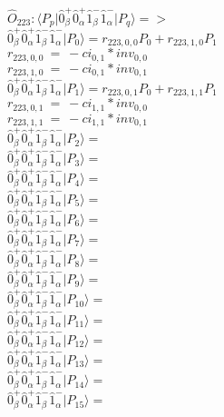 \documentclass[14pt]{article}
\begin{document}
    $\hat{O}_{223}:  \langle{P_p}\vert \hat{0}_{\beta}^{+}\hat{0}_{\alpha}^{+}\hat{1}_{\beta}^{-}\hat{1}_{\alpha}^{-} \vert{P_q}\rangle => $ \\ 
    $ \hat{0}_{\beta}^{+}\hat{0}_{\alpha}^{+}\hat{1}_{\beta}^{-}\hat{1}_{\alpha}^{-} \vert{P_{0}}\rangle = {r}_{223,0,0}P_{0}+{r}_{223,1,0}P_{1} $ \\ 
    ${r}_{223,0,0}\ =\ -{ci}_{0,1}*{inv}_{0,0} $ \\ 
    ${r}_{223,1,0}\ =\ -{ci}_{0,1}*{inv}_{0,1} $ \\ 
    $ \hat{0}_{\beta}^{+}\hat{0}_{\alpha}^{+}\hat{1}_{\beta}^{-}\hat{1}_{\alpha}^{-} \vert{P_{1}}\rangle = {r}_{223,0,1}P_{0}+{r}_{223,1,1}P_{1} $ \\ 
    ${r}_{223,0,1}\ =\ -{ci}_{1,1}*{inv}_{0,0} $ \\ 
    ${r}_{223,1,1}\ =\ -{ci}_{1,1}*{inv}_{0,1} $ \\ 
    $ \hat{0}_{\beta}^{+}\hat{0}_{\alpha}^{+}\hat{1}_{\beta}^{-}\hat{1}_{\alpha}^{-} \vert{P_{2}}\rangle =  $ \\ 
    $ \hat{0}_{\beta}^{+}\hat{0}_{\alpha}^{+}\hat{1}_{\beta}^{-}\hat{1}_{\alpha}^{-} \vert{P_{3}}\rangle =  $ \\ 
    $ \hat{0}_{\beta}^{+}\hat{0}_{\alpha}^{+}\hat{1}_{\beta}^{-}\hat{1}_{\alpha}^{-} \vert{P_{4}}\rangle =  $ \\ 
    $ \hat{0}_{\beta}^{+}\hat{0}_{\alpha}^{+}\hat{1}_{\beta}^{-}\hat{1}_{\alpha}^{-} \vert{P_{5}}\rangle =  $ \\ 
    $ \hat{0}_{\beta}^{+}\hat{0}_{\alpha}^{+}\hat{1}_{\beta}^{-}\hat{1}_{\alpha}^{-} \vert{P_{6}}\rangle =  $ \\ 
    $ \hat{0}_{\beta}^{+}\hat{0}_{\alpha}^{+}\hat{1}_{\beta}^{-}\hat{1}_{\alpha}^{-} \vert{P_{7}}\rangle =  $ \\ 
    $ \hat{0}_{\beta}^{+}\hat{0}_{\alpha}^{+}\hat{1}_{\beta}^{-}\hat{1}_{\alpha}^{-} \vert{P_{8}}\rangle =  $ \\ 
    $ \hat{0}_{\beta}^{+}\hat{0}_{\alpha}^{+}\hat{1}_{\beta}^{-}\hat{1}_{\alpha}^{-} \vert{P_{9}}\rangle =  $ \\ 
    $ \hat{0}_{\beta}^{+}\hat{0}_{\alpha}^{+}\hat{1}_{\beta}^{-}\hat{1}_{\alpha}^{-} \vert{P_{10}}\rangle =  $ \\ 
    $ \hat{0}_{\beta}^{+}\hat{0}_{\alpha}^{+}\hat{1}_{\beta}^{-}\hat{1}_{\alpha}^{-} \vert{P_{11}}\rangle =  $ \\ 
    $ \hat{0}_{\beta}^{+}\hat{0}_{\alpha}^{+}\hat{1}_{\beta}^{-}\hat{1}_{\alpha}^{-} \vert{P_{12}}\rangle =  $ \\ 
    $ \hat{0}_{\beta}^{+}\hat{0}_{\alpha}^{+}\hat{1}_{\beta}^{-}\hat{1}_{\alpha}^{-} \vert{P_{13}}\rangle =  $ \\ 
    $ \hat{0}_{\beta}^{+}\hat{0}_{\alpha}^{+}\hat{1}_{\beta}^{-}\hat{1}_{\alpha}^{-} \vert{P_{14}}\rangle =  $ \\ 
    $ \hat{0}_{\beta}^{+}\hat{0}_{\alpha}^{+}\hat{1}_{\beta}^{-}\hat{1}_{\alpha}^{-} \vert{P_{15}}\rangle =  $ \\ 
    
\end{document}
